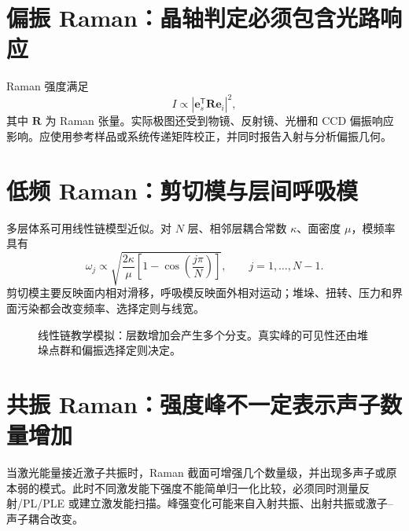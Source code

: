 \documentclass[11pt,a4paper,openany,fontset=fandol]{ctexbook}
\begin{document}
\section{偏振 Raman：晶轴判定必须包含光路响应}

Raman 强度满足
\[
I\propto \left|\mathbf e_s^{\mathsf T}\mathbf R\mathbf e_i\right|^2,
\]
其中 $\mathbf R$ 为 Raman 张量。实际极图还受到物镜、反射镜、光栅和 CCD 偏振响应影响。应使用参考样品或系统传递矩阵校正，并同时报告入射与分析偏振几何。

\section{低频 Raman：剪切模与层间呼吸模}

多层体系可用线性链模型近似。对 $N$ 层、相邻层耦合常数 $\kappa$、面密度 $\mu$，模频率具有
\[
\omega_j\propto \sqrt{\frac{2\kappa}{\mu}\left[1-\cos\left(\frac{j\pi}{N}\right)\right]},\qquad j=1,\ldots,N-1.
\]
剪切模主要反映面内相对滑移，呼吸模反映面外相对运动；堆垛、扭转、压力和界面污染都会改变频率、选择定则与线宽。

\begin{figure}[H]
\centering
{}
\caption{线性链教学模拟：层数增加会产生多个分支。真实峰的可见性还由堆垛点群和偏振选择定则决定。}
\end{figure}

\section{共振 Raman：强度峰不一定表示声子数量增加}

当激光能量接近激子共振时，Raman 截面可增强几个数量级，并出现多声子或原本弱的模式。此时不同激发能下强度不能简单归一化比较，必须同时测量反射/PL/PLE 或建立激发能扫描。峰强变化可能来自入射共振、出射共振或激子--声子耦合改变。
\end{document}
